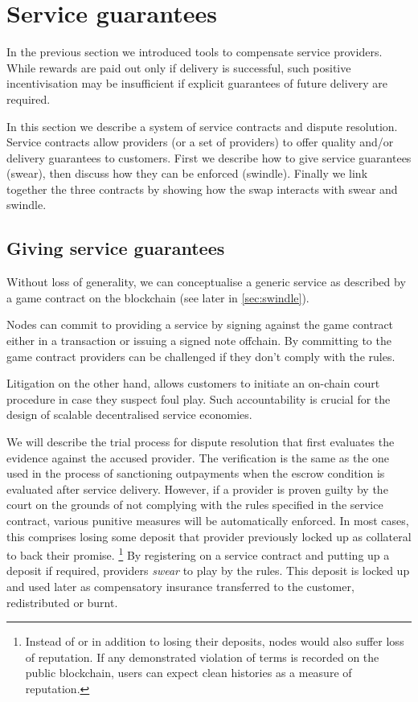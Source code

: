 \section{Service guarantees}
\label{sec:courtroom}

In the previous section we introduced tools to compensate service providers.
While rewards are paid out only if delivery is successful,
such positive incentivisation may be insufficient if
explicit guarantees of future delivery are required.

In this section we describe a system of service contracts and dispute resolution.
Service contracts allow providers (or a set of providers)
to offer quality and/or delivery guarantees to customers.
First we describe how to give service guarantees (swear), then discuss how they can be enforced (swindle).
Finally we link together the three contracts by showing how the swap interacts with swear and swindle.


\subsection{Giving service guarantees}

Without loss of generality, we can conceptualise a generic service as described by a game contract
on the blockchain (see later in \ref{sec:swindle}).


Nodes can commit to providing a service by signing against the game contract
either in a transaction or issuing a signed note offchain.
By committing to the game contract  providers can be challenged if they don't comply with the rules.

Litigation on the other hand, allows customers to initiate an on-chain court procedure
in case they suspect foul play. Such accountability is
crucial for the design of scalable decentralised service economies.

We will describe the trial process for dispute
resolution that first evaluates the evidence against the accused provider.
The verification is the same as the one used in the process of sanctioning outpayments when the escrow condition is evaluated after service delivery.
However, if a provider is proven guilty by the court on the grounds of not complying with the rules specified in the service contract, various punitive measures will be
automatically enforced. In most cases, this comprises losing some deposit that
provider previously locked up as collateral to back their promise.%
%
\footnote{Instead of or in addition to losing their deposits, nodes would also
suffer loss of reputation. If any demonstrated violation of terms is
recorded on the public blockchain, users can expect clean histories as a measure
of reputation.}
%
By registering on a service contract and putting up a deposit if required, providers
\emph{swear} to play by the rules.
This deposit is locked up and used later as compensatory insurance transferred to the
customer, redistributed or burnt.

